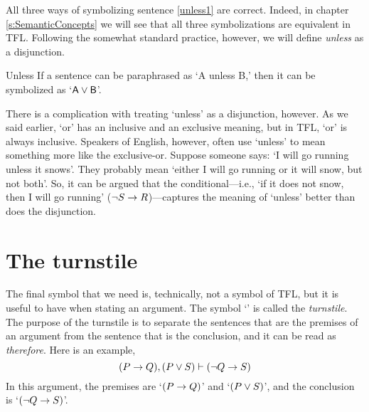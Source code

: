 All three ways of symbolizing sentence \ref{unless1} are correct. Indeed, in chapter \ref{s:SemanticConcepts} we will see that all three symbolizations are equivalent in TFL. Following the somewhat standard practice, however, we will define \textit{unless} as a disjunction.
	
\begin{factboxy}{Unless}
If a sentence can be paraphrased as `A unless B,' then it can be symbolized as `$\mathsf{A}\vee\mathsf{B}$'.
\end{factboxy}

There is a complication with treating `unless' as a disjunction, however. As we said earlier, `or' has an inclusive and an exclusive meaning, but in TFL, `or' is always inclusive. Speakers of English, however, often use `unless' to mean something more like the exclusive-or. Suppose someone says: `I will go running unless it snows'. They probably mean `either I will go running or it will snow, but not both'. So, it can be argued that the conditional---i.e., `if it does not snow, then I will go running' (${\neg} S \rightarrow R$)---captures the meaning of `unless' better than does the disjunction.


\section{The turnstile}

The final symbol that we need is, technically, not a symbol of TFL, but it is useful to have when stating an argument. The symbol `\proves' is called the \textit{turnstile}. The purpose of the turnstile is to separate the sentences that are the premises of an argument from the sentence that is the conclusion, and it can be read as \textit{therefore}. Here is an example,
$$(P \rightarrow Q), (P \vee S) \vdash ({\neg} Q \rightarrow S)$$
In this argument, the premises are `$(P \rightarrow Q)$' and `$(P \vee S)$', and the conclusion is `$({\neg} Q \rightarrow S)$'.





